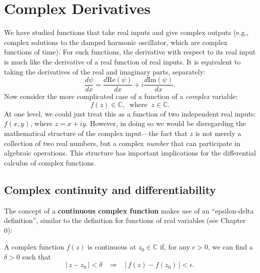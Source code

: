 \documentclass[10pt,a4paper]{article}
\begin{document}
\setcounter{page}{43}

\section{Complex Derivatives}\label{complex-derivatives}

We have studied functions that take real inputs and give complex
outputs (e.g., complex solutions to the damped harmonic oscillator,
which are complex functions of time). For such functions, the
derivative with respect to its real input is much like the derivative
of a real function of real inputs. It is equivalent to taking the
derivatives of the real and imaginary parts, separately:
\begin{equation}
\frac{d\psi}{dx} = \frac{d\mathrm{Re}(\psi)}{dx} + i \frac{d\mathrm{Im}(\psi)}{dx}.
\end{equation}
Now consider the more complicated case of a function of a \emph{complex}
variable:
\begin{equation}
f(z) \in \mathbb{C}, \;\;\mathrm{where}\;\; z \in \mathbb{C}.
\end{equation}
At one level, we could just treat this as a function of two independent
real inputs: $f(x,y)$, where $z = x + i y$. However, in doing so we
would be disregarding the mathematical structure of the complex
input---the fact that $z$ is not merely a collection of two real
numbers, but a complex \emph{number} that can participate in algebraic
operations. This structure has important implications for the
differential calculus of complex functions.


\subsection{Complex continuity and differentiability}
\label{complex-continuity-and-differentiability}

The concept of a \textbf{continuous complex function} makes use of an
``epsilon-delta definition'', similar to the definition for functions
of real variables (see Chapter 0):

\begin{framed}
\noindent
A complex function $f(z)$ is continuous at $z_0 \in \mathbb{C}$ if,
for any $\epsilon > 0$, we can find a $\delta > 0$ such that
\begin{equation}
\big|\, z - z_0 \,\big| < \delta \;\;\; \Rightarrow \;\;\; \big|\, f(z) - f(z_0) \,\big| < \epsilon.
\end{equation}
\end{framed}
\end{document}

